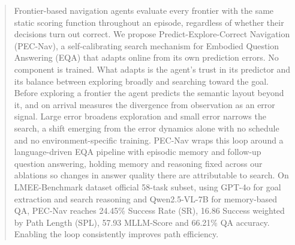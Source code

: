 \begin{abstract}
Frontier-based navigation agents evaluate every frontier with the same static scoring function throughout an episode, regardless of whether their decisions turn out correct. We propose Predict-Explore-Correct Navigation (PEC-Nav), a self-calibrating search mechanism for Embodied Question Answering (EQA) that adapts online from its own prediction errors. No component is trained. What adapts is the agent's trust in its predictor and its balance between exploring broadly and searching toward the goal. Before exploring a frontier the agent predicts the semantic layout beyond it, and on arrival measures the divergence from observation as an error signal. Large error broadens exploration and small error narrows the search, a shift emerging from the error dynamics alone with no schedule and no environment-specific training. PEC-Nav wraps this loop around a language-driven EQA pipeline with episodic memory and follow-up question answering, holding memory and reasoning fixed across our ablations so changes in answer quality there are attributable to search. On LMEE-Benchmark dataset official 58-task subset, using GPT-4o for goal extraction and search reasoning and Qwen2.5-VL-7B for memory-based QA, PEC-Nav reaches 24.45\% Success Rate (SR), 16.86 Success weighted by Path Length (SPL), 57.93 MLLM-Score and 66.21\% QA accuracy. Enabling the loop consistently improves path efficiency.
\end{abstract}
